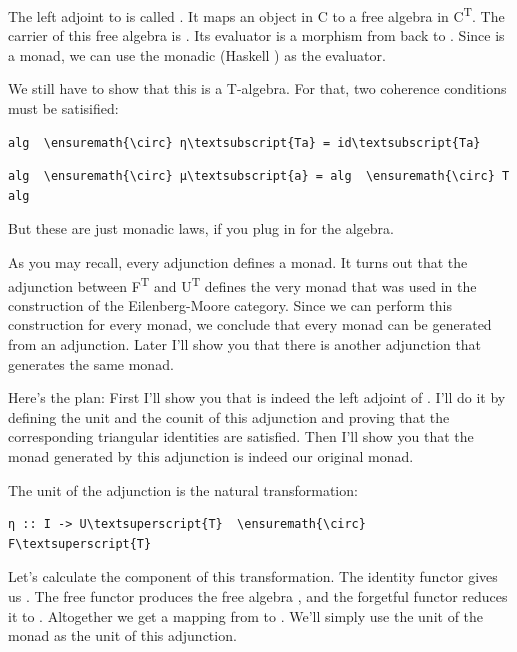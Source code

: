 The left adjoint to  is called . It maps an object
 in C to a free algebra in C\textsuperscript{T}. The carrier
of this free algebra is . Its evaluator is a morphism from
 back to . Since  is a monad,
we can use the monadic  (Haskell ) as the
evaluator.

We still have to show that this is a T-algebra. For that, two coherence
conditions must be satisified:

\begin{Verbatim}[commandchars=\\\{\}]
alg  \ensuremath{\circ} η\textsubscript{Ta} = id\textsubscript{Ta}
\end{Verbatim}
\begin{Verbatim}[commandchars=\\\{\}]
alg  \ensuremath{\circ} μ\textsubscript{a} = alg  \ensuremath{\circ} T alg
\end{Verbatim}
But these are just monadic laws, if you plug in  for the
algebra.

As you may recall, every adjunction defines a monad. It turns out that
the adjunction between F\textsuperscript{T} and U\textsuperscript{T}
defines the very monad  that was used in the construction of
the Eilenberg-Moore category. Since we can perform this construction for
every monad, we conclude that every monad can be generated from an
adjunction. Later I'll show you that there is another adjunction that
generates the same monad.

Here's the plan: First I'll show you that  is indeed the left
adjoint of . I'll do it by defining the unit and the counit
of this adjunction and proving that the corresponding triangular
identities are satisfied. Then I'll show you that the monad generated by
this adjunction is indeed our original monad.

The unit of the adjunction is the natural transformation:

\begin{Verbatim}[commandchars=\\\{\}]
η :: I -> U\textsuperscript{T}  \ensuremath{\circ} F\textsuperscript{T}
\end{Verbatim}
Let's calculate the  component of this transformation. The
identity functor gives us . The free functor produces the free
algebra , and the forgetful functor reduces it to
. Altogether we get a mapping from  to
. We'll simply use the unit of the monad  as the
unit of this adjunction.

